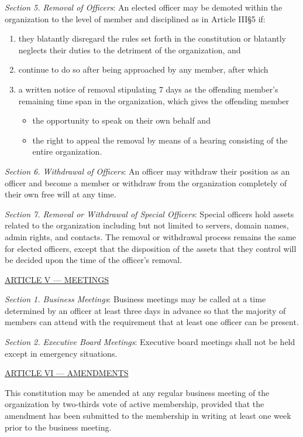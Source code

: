 \documentclass{article}
\begin{document}
\emph{Section 5. Removal of Officers}: An elected officer may be demoted within the organization to the level of member and disciplined as in Article III§5 if:
\begin{enumerate}
  \item they blatantly disregard the rules set forth in the constitution or blatantly neglects their duties to the detriment of the organization, and
  \item continue to do so after being approached by any member, after which
  \item a written notice of removal stipulating 7 days as the offending member's remaining time span in the organization, which gives the offending member
  \begin{itemize}
    \item the opportunity to speak on their own behalf and
    \item the right to appeal the removal by means of a hearing consisting of the entire organization.
  \end{itemize}
\end{enumerate}

\emph{Section 6. Withdrawal of Officers}: An officer may withdraw their position as an officer and become a member or withdraw from the organization completely of their own free will at any time.

\emph{Section 7. Removal or Withdrawal of Special Officers}: Special officers hold assets related to the organization including but not limited to servers, domain names, admin rights, and contacts.  The removal or withdrawal process remains the same for elected officers, except that the disposition of the assets that they control will be decided upon the time of the officer's removal.

\bigskip

\large{\underline{ARTICLE V --- MEETINGS}}

\emph{Section 1. Business Meetings}: Business meetings may be called at a time determined by an officer at least three days in advance so that the majority of members can attend with the requirement that at least one officer can be present.

\emph{Section 2. Executive Board Meetings}: Executive board meetings shall not be held except in emergency situations.

\bigskip

\large{\underline{ARTICLE VI --- AMENDMENTS}}

This constitution may be amended at any regular business meeting of the organization by two-thirds vote of active membership, provided that the amendment has been submitted to the membership in writing at least one week prior to the business meeting.
\end{document}
